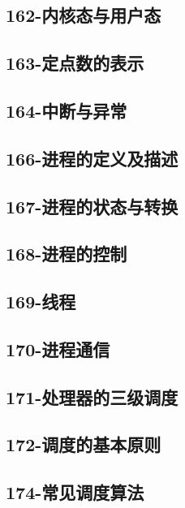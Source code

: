 \subsection{162-内核态与用户态}

\subsection{163-定点数的表示}

\subsection{164-中断与异常}

\subsection{166-进程的定义及描述}

\subsection{167-进程的状态与转换}

\subsection{168-进程的控制}

\subsection{169-线程}

\subsection{170-进程通信}

\subsection{171-处理器的三级调度}

\subsection{172-调度的基本原则}

\subsection{174-常见调度算法}

